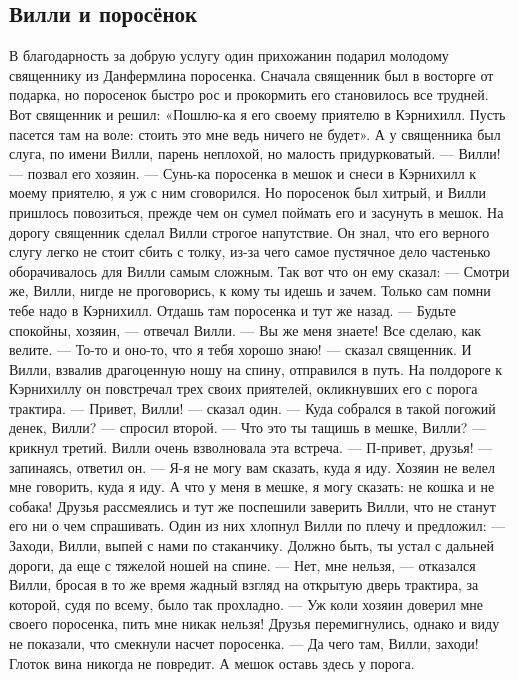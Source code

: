 \documentclass[12pt]{article}
\begin{document}
\newpage

\subsection*{Вилли и поросёнок}

В благодарность за добрую услугу один прихожанин подарил молодому священнику из Данфермлина поросенка.
Сначала священник был в восторге от подарка, но поросенок быстро рос и прокормить его становилось все трудней. Вот священник и решил: «Пошлю-ка я его своему приятелю в Кэрнихилл. Пусть пасется там на воле: стоить это мне ведь ничего не будет».
А у священника был слуга, по имени Вилли, парень неплохой, но малость придурковатый.
— Вилли! — позвал его хозяин. — Сунь-ка поросенка в мешок и снеси в Кэрнихилл к моему приятелю, я уж с ним сговорился.
Но поросенок был хитрый, и Вилли пришлось повозиться, прежде чем он сумел поймать его и засунуть в мешок.
На дорогу священник сделал Вилли строгое напутствие. Он знал, что его верного слугу легко не стоит сбить с толку, из-за чего самое пустячное дело частенько оборачивалось для Вилли самым сложным. Так вот что он ему сказал:
— Смотри же, Вилли, нигде не проговорись, к кому ты идешь и зачем. Только сам помни тебе надо в Кэрнихилл. Отдашь там поросенка и тут же назад.
— Будьте спокойны, хозяин, — отвечал Вилли. — Вы же меня знаете! Все сделаю, как велите.
— То-то и оно-то, что я тебя хорошо знаю! — сказал священник.
И Вилли, взвалив драгоценную ношу на спину, отправился в путь. На полдороге к Кэрнихиллу он повстречал трех своих приятелей, окликнувших его с порога трактира.
— Привет, Вилли! — сказал один.
— Куда собрался в такой погожий денек, Вилли? — спросил второй.
— Что это ты тащишь в мешке, Вилли? — крикнул третий.
Вилли очень взволновала эта встреча.
— П-привет, друзья! — запинаясь, ответил он. — Я-я не могу вам сказать, куда я иду. Хозяин не велел мне говорить, куда я иду. А что у меня в мешке, я могу сказать: не кошка и не собака!
Друзья рассмеялись и тут же поспешили заверить Вилли, что не станут его ни о чем спрашивать. Один из них хлопнул Вилли по плечу и предложил:
— Заходи, Вилли, выпей с нами по стаканчику. Должно быть, ты устал с дальней дороги, да еще с тяжелой ношей на спине.
— Нет, мне нельзя, — отказался Вилли, бросая в то же время жадный взгляд на открытую дверь трактира, за которой, судя по всему, было так прохладно. — Уж коли хозяин доверил мне своего поросенка, пить мне никак нельзя!
Друзья перемигнулись, однако и виду не показали, что смекнули насчет поросенка.
— Да чего там, Вилли, заходи! Глоток вина никогда не повредит. А мешок оставь здесь у порога.
\end{document}
